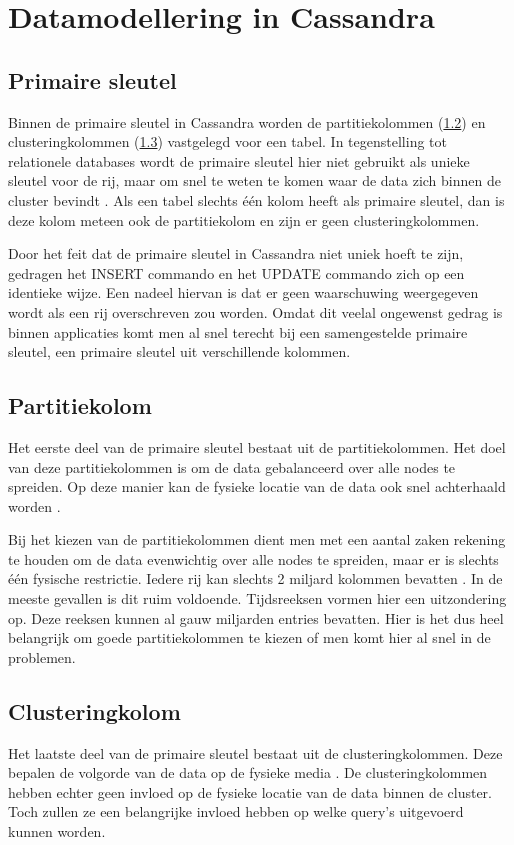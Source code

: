 \chapter{Datamodellering in Cassandra}
\label{ch:cassandra_modelling}
\section{Primaire sleutel}
Binnen de primaire sleutel in Cassandra worden de partitiekolommen (\ref{partition_key}) en clusteringkolommen (\ref{clustering_key}) vastgelegd voor een tabel.
In tegenstelling tot relationele databases wordt de primaire sleutel hier niet gebruikt als unieke sleutel voor de rij, maar om snel te weten te komen waar de data zich binnen de cluster bevindt \citep{kan2014cassandra}.
Als een tabel slechts één kolom heeft als primaire sleutel, dan is deze kolom meteen ook de partitiekolom en zijn er geen clusteringkolommen.

Door het feit dat de primaire sleutel in Cassandra niet uniek hoeft te zijn, gedragen het INSERT commando en het UPDATE commando zich op een identieke wijze.
Een nadeel hiervan is dat er geen waarschuwing weergegeven wordt als een rij overschreven zou worden.
Omdat dit veelal ongewenst gedrag is binnen applicaties komt men al snel terecht bij een samengestelde primaire sleutel, een primaire sleutel uit verschillende kolommen.

\section{Partitiekolom}
\label{partition_key}
Het eerste deel van de primaire sleutel bestaat uit de partitiekolommen.
Het doel van deze partitiekolommen is om de data gebalanceerd over alle nodes te spreiden.
Op deze manier kan de fysieke locatie van de data ook snel achterhaald worden \citep{kan2014cassandra}.

Bij het kiezen van de partitiekolommen dient men met een aantal zaken rekening te houden om de data evenwichtig over alle nodes te spreiden, maar er is slechts één fysische restrictie.
Iedere rij kan slechts 2 miljard kolommen bevatten \citep{McFadin2013Timeseries}.
In de meeste gevallen is dit ruim voldoende.
Tijdsreeksen vormen hier een uitzondering op.
Deze reeksen kunnen al gauw miljarden entries bevatten.
Hier is het dus heel belangrijk om  goede partitiekolommen te kiezen of men komt hier al snel in de problemen.

\section{Clusteringkolom}
\label{clustering_key}
Het laatste deel van de primaire sleutel bestaat uit de clusteringkolommen.
Deze bepalen de volgorde van de data op de fysieke media \citep{strickland2014availability}.
De clusteringkolommen hebben echter geen invloed op de fysieke locatie van de data binnen de cluster.
Toch zullen ze een belangrijke invloed hebben op welke query's uitgevoerd kunnen worden.


